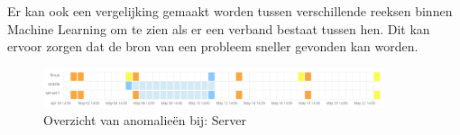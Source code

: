 Er kan ook een vergelijking gemaakt worden tussen verschillende reeksen binnen Machine Learning om te zien als er een verband bestaat tussen hen. 
Dit kan ervoor zorgen dat de bron van een probleem sneller gevonden kan worden.
\begin{figure}[h]
	\includegraphics[width=10cm]{img/machinelearning2}
	\caption{Overzicht van anomalieën bij: Server}
	\label{fig:machinelearning2}
\end{figure}
